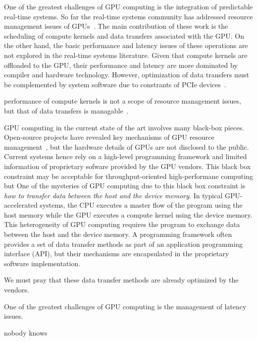 One of the greatest challenges of GPU computing is the integration of
predictable real-time systems.
So far the real-time systems community has addressed resource management
issues of GPUs~\cite{Basaran_ECRTS12, Elliott_RTS12, Elliott_ECRTS12,
Kato_ATC11, Kato_RTAS11, Kato_RTSS11}.
The main contribution of these work is the scheduling of compute
kernels and data transfers associated with the GPU.
On the other hand, the basic performance and latency issues of these
operations are not explored in the real-time systems literature.
Given that compute kernels are offloaded to the GPU, their performance
and latency are more dominated by compiler and hardware technology.
However, optimization of data transfers must be complemented by system
software due to constrants of PCIe devices~\cite{Kato_ATC12}.

performance of compute kernels is not a scope of resource management
issues, but that of data transfers is managable~\cite{Kato_ATC12}.

GPU computing in the current state of the art involves many black-box
pieces.
Open-source projects have revealed key mechanisms of GPU
resource management~\cite{Kato_ATC11, Kato_ATC12}, but the hardware
details of GPUs are not disclosed to the public.
Current systems hence rely on a high-level programming framework and
limited information of proprietary sofware provided by the GPU
vendors.
This black box constraint may be acceptable for throughput-oriented
high-performane computing but 
One of the mysteries of GPU computing due to this black box constraint
is \textit{how to transfer data between the host and the device memory}.
In typical GPU-accelerated systems, the CPU executes a master flow of
the program using the host memory while the GPU executes a compute
kernel using the device memory.
This heterogeneity of GPU computing requires the program to exchange
data between the host and the device memory.
A programming framework often provides a set of data transfer methods as
part of an application programming interface (API), but their mechanisms
are encapsulated in the proprietary software implementation.

We must pray that these data transfer methods are already optimized by
the vendors.

One of the greatest challenges of GPU computing is the management of
latency issues.

nobody knows